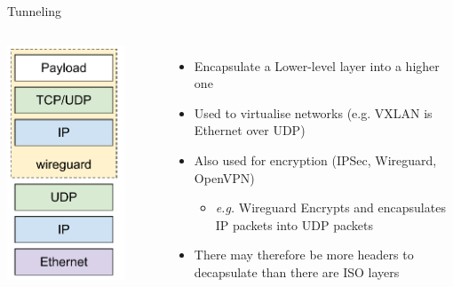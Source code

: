 \begin{frame}{Tunneling}
	\begin{columns}
		\includegraphics[width=0.8\textwidth]{slides/networking-stack-overview/wireguard.pdf}
	\begin{itemize}
		\item Encapsulate a Lower-level layer into a higher one
		\item Used to virtualise networks (e.g. VXLAN is Ethernet over UDP)
		\item Also used for encryption (IPSec, Wireguard, OpenVPN)
			\begin{itemize}
				\item \textit{e.g.} Wireguard Encrypts and encapsulates IP packets into UDP packets
			\end{itemize}
		\item There may therefore be more headers to decapsulate than there are ISO layers
	\end{itemize}
	\end{columns}
\end{frame}

